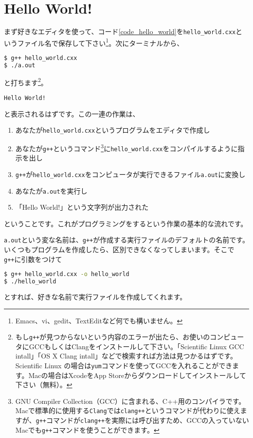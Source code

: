 \section{Hello World!}

まず好きなエディタを使って、コード\ref{code_hello_world}を\texttt{hello\_world.cxx}というファイル名で保存して下さい\footnote{Emacs、vi、gedit、TextEditなど何でも構いません。}。次にターミナルから、
\begin{lstlisting}[language=bash]
$ g++ hello_world.cxx
$ ./a.out
\end{lstlisting}
と打ちます\footnote{もし\texttt{g++}が見つからないという内容のエラーが出たら、お使いのコンピュータにGCCもしくはClangをインストールして下さい。「Scientific Linux GCC intall」「OS X Clang intall」などで検索すれば方法は見つかるはずです。Scientific Linux の場合は\texttt{yum}コマンドを使ってGCCを入れることができます。Macの場合はXcodeをApp Storeからダウンロードしてインストールして下さい（無料）。}。
\begin{lstlisting}
Hello World!
\end{lstlisting}
と表示されるはずです。この一連の作業は、
\begin{enumerate}
  \item あなたが\texttt{hello\_world.cxx}というプログラムをエディタで作成し
  \item あなたが\texttt{g++}というコマンド\footnote{GNU Compiler Collection（GCC）に含まれる、C++用のコンパイラです。Macで標準的に使用する\texttt{Clang}では\texttt{clang++}というコマンドが代わりに使えますが、\texttt{g++}コマンドが\texttt{clang++}を実際には呼び出すため、GCCの入っていないMacでも\texttt{g++}コマンドを使うことができます。}に\texttt{hello\_world.cxx}をコンパイルするように指示を出し
  \item \texttt{g++}が\texttt{hello\_world.cxx}をコンピュータが実行できるファイル\texttt{a.out}に変換し
  \item あなたが\texttt{a.out}を実行し
  \item 「Hello World!」という文字列が出力された
\end{enumerate}
ということです。これがプログラミングをするという作業の基本的な流れです。

\texttt{a.out}という変な名前は、\texttt{g++}が作成する実行ファイルのデフォルトの名前です。いくつもプログラムを作成したら、区別できなくなってしまいます。そこで\texttt{g++}に引数をつけて
\begin{lstlisting}[language=bash]
$ g++ hello_world.cxx -o hello_world
$ ./hello_world
\end{lstlisting}
とすれば、好きな名前で実行ファイルを作成してくれます。

